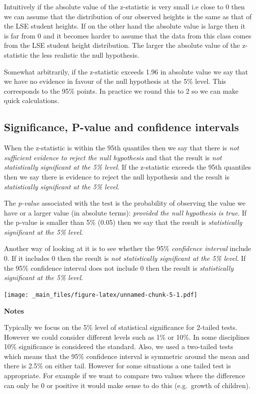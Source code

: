\documentclass[
]{gitbook}
\begin{document}
Intuitively if the absolute value of the z-statistic is very small i.e close to 0 then we can assume that the distribution of our observed heights is the same as that of the LSE student heights. If on the other hand the absolute value is large then it is far from 0 and it becomes harder to assume that the data from this class comes from the LSE student height distribution. The larger the absolute value of the z-statistic the less realistic the null hypothesis.

Somewhat arbitrarily, if the z-statistic exceeds 1.96 in absolute value we say that we have no evidence in favour of the null hypothesis at the 5\% level. This corresponds to the 95\% points. In practice we round this to 2 so we can make quick calculations.

\hypertarget{significance-p-value-and-confidence-intervals}{%
\subsection{Significance, P-value and confidence intervals}\label{significance-p-value-and-confidence-intervals}}

When the z-statistic is within the 95th quantiles then we say that there is \emph{not sufficient evidence to reject the null hypothesis} and that the result is \emph{not statistically significant at the 5\% level}. If the z-statistic exceeds the 95th quantiles then we say there is evidence to reject the null hypothesis and the result is \emph{statistically significant at the 5\% level}.

The \emph{p-value} associated with the test is the probability of observing the value we have or a larger value (in absolute terms): \emph{provided the null hypothesis is true}. If the p-value is smaller than 5\% (0.05) then we say that the result is \emph{statistically significant at the 5\% level}.

Another way of looking at it is to see whether the 95\% \emph{confidence interval} include 0. If it includes 0 then the result is \emph{not statistically significant at the 5\% level}. If the 95\% confidence interval does not include 0 then the result is \emph{statistically significant at the 5\% level}.

\texttt{[image: \_main\_files/figure-latex/unnamed-chunk-5-1.pdf]}

\textbf{Notes}

Typically we focus on the 5\% level of statistical significance for 2-tailed tests. However we could consider different levels such as 1\% or 10\%. In some disciplines 10\% significance is considered the standard. Also, we used a two-tailed tests which means that the 95\% confidence interval is symmetric around the mean and there is 2.5\% on either tail. However for some situations a one tailed test is appropriate. For example if we want to compare two values where the difference can only be 0 or positive it would make sense to do this (e.g.~growth of children).
\end{document}
